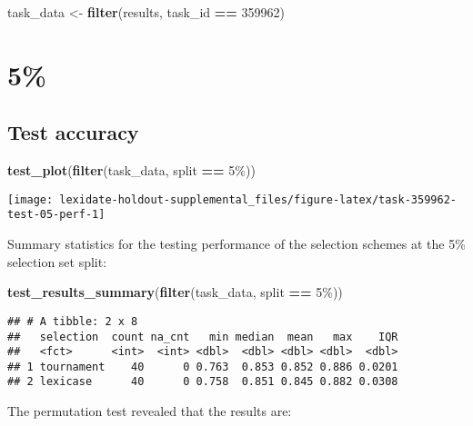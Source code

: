\documentclass[
]{book}
\newenvironment{Shaded}{\begin{snugshade}}{\end{snugshade}}
\newcommand{\DecValTok}[1]{\textcolor[rgb]{0.00,0.00,0.81}{#1}}
\newcommand{\FunctionTok}[1]{\textcolor[rgb]{0.13,0.29,0.53}{\textbf{#1}}}
\newcommand{\NormalTok}[1]{#1}
\newcommand{\OtherTok}[1]{\textcolor[rgb]{0.56,0.35,0.01}{#1}}
\newcommand{\SpecialCharTok}[1]{\textcolor[rgb]{0.81,0.36,0.00}{\textbf{#1}}}
\newcommand{\StringTok}[1]{\textcolor[rgb]{0.31,0.60,0.02}{#1}}
\begin{document}
\begin{Shaded}
\begin{Highlighting}[]
\NormalTok{task\_data }\OtherTok{\textless{}{-}} \FunctionTok{filter}\NormalTok{(results, task\_id }\SpecialCharTok{==} \DecValTok{359962}\NormalTok{)}
\end{Highlighting}
\end{Shaded}

\hypertarget{section-55}{%
\section{5\%}\label{section-55}}

\hypertarget{test-accuracy-55}{%
\subsection{Test accuracy}\label{test-accuracy-55}}

\begin{Shaded}
\begin{Highlighting}[]
\FunctionTok{test\_plot}\NormalTok{(}\FunctionTok{filter}\NormalTok{(task\_data, split }\SpecialCharTok{==} \StringTok{\textquotesingle{}5\%\textquotesingle{}}\NormalTok{))}
\end{Highlighting}
\end{Shaded}

\texttt{[image: lexidate-holdout-supplemental\_files/figure-latex/task-359962-test-05-perf-1]}

Summary statistics for the testing performance of the selection schemes at the 5\% selection set split:

\begin{Shaded}
\begin{Highlighting}[]
\FunctionTok{test\_results\_summary}\NormalTok{(}\FunctionTok{filter}\NormalTok{(task\_data, split }\SpecialCharTok{==} \StringTok{\textquotesingle{}5\%\textquotesingle{}}\NormalTok{))}
\end{Highlighting}
\end{Shaded}

\begin{verbatim}
## # A tibble: 2 x 8
##   selection  count na_cnt   min median  mean   max    IQR
##   <fct>      <int>  <int> <dbl>  <dbl> <dbl> <dbl>  <dbl>
## 1 tournament    40      0 0.763  0.853 0.852 0.886 0.0201
## 2 lexicase      40      0 0.758  0.851 0.845 0.882 0.0308
\end{verbatim}

The permutation test revealed that the results are:
\end{document}
